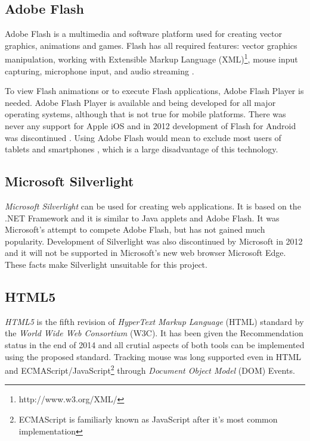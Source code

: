 \subsection{Adobe Flash}
Adobe Flash is a multimedia and software platform used for creating vector graphics, animations and games. Flash has all required features: vector graphics manipulation, working with Extensible Markup Language (XML)\footnote{http://www.w3.org/XML/}, mouse input capturing, microphone input, and audio streaming \cite{flash}. 

To view Flash animations or to execute Flash applications, Adobe Flash Player is needed. Adobe Flash Player is available and being developed for all major operating systems, although that is not true for mobile platforms. There was never any support for Apple iOS \cite{steve_jobs} and in 2012 development of Flash for Android was discontinued \cite{flash_mobile}. Using Adobe Flash would mean to exclude most users of tablets and smartphones \cite{mobile_statistics}, which is a large disadvantage of this technology.

\subsection{Microsoft Silverlight}
\textit{Microsoft Silverlight} \cite{silverlight} can be used for creating web applications. It is based on the .NET Framework and it is similar to Java applets and Adobe Flash. It was Microsoft's attempt to compete Adobe Flash, but has not gained much popularity. Development of Silverlight was also discontinued by Microsoft in 2012 and it will not be supported in Microsoft's new web browser Microsoft Edge\cite{silverlight_is_dead}. These facts make Silverlight unsuitable for this project.


\subsection{HTML5}
\textit{HTML5} is the fifth revision of \textit{HyperText Markup Language} (HTML) standard by the \textit{World Wide Web Consortium} (W3C). It has been given the Recommendation status in the end of 2014 and all crutial aspects of both tools can be implemented using the proposed standard. Tracking mouse was long supported even in HTML and ECMAScript/JavaScript\footnote{ECMAScript is familiarly known as JavaScript after it's most common implementation\cite{javascript_vs_ecmascript}} through \textit{Document Object Model} (DOM) Events\cite{dom_mouse_events}.

